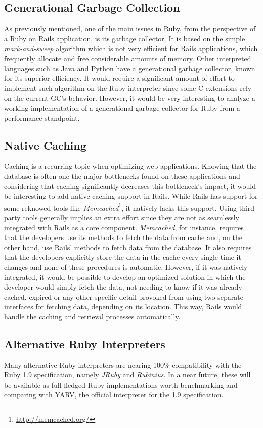 \subsection{Generational Garbage Collection}
As previously mentioned, one of the main issues in Ruby, from the perspective of a Ruby on Rails application, is its garbage collector. It is based on the simple \textit{mark-and-sweep} algorithm which is not very efficient for Rails applications, which frequently allocate and free considerable amounts of memory. Other interpreted languages such as Java and Python have a generational garbage collector, known for its superior efficiency. It would require a significant amount of effort to implement such algorithm on the Ruby interpreter since some C extensions rely on the current GC's behavior. However, it would be very interesting to analyze a working implementation of a generational garbage collector for Ruby from a performance standpoint.

\subsection{Native Caching}
Caching is a recurring topic when optimizing web applications. Knowing that the database is often one the major bottlenecks found on these applications and considering that caching significantly decreases this bottleneck's impact, it would be interesting to add native caching support in Rails. While Rails has support for some reknowed tools like \textit{Memcached}\footnote{\url{http://memcached.org/}}, it natively lacks this support. Using third-party tools generally implies an extra effort since they are not as seamlessly integrated with Rails as a core component. \textit{Memcached}, for instance, requires that the developers use its methods to fetch the data from cache and, on the other hand, use Rails' methods to fetch data from the database. It also requires that the developers explicitly store the data in the cache every single time it changes and none of these procedures is automatic. However, if it was natively integrated, it would be possible to develop an optimized solution in which the developer would simply fetch the data, not needing to know if it was already cached, expired or any other specific detail provoked from using two separate interfaces for fetching data, depending on its location. This way, Rails would handle the caching and retrieval processes automatically.

\subsection{Alternative Ruby Interpreters}
Many alternative Ruby interpreters are nearing 100\% compatibility with the Ruby 1.9 specification, namely \textit{JRuby} and \textit{Rubinius}. In a near future, these will be available as full-fledged Ruby implementations worth benchmarking and comparing with YARV, the official interpreter for the 1.9 specification.

